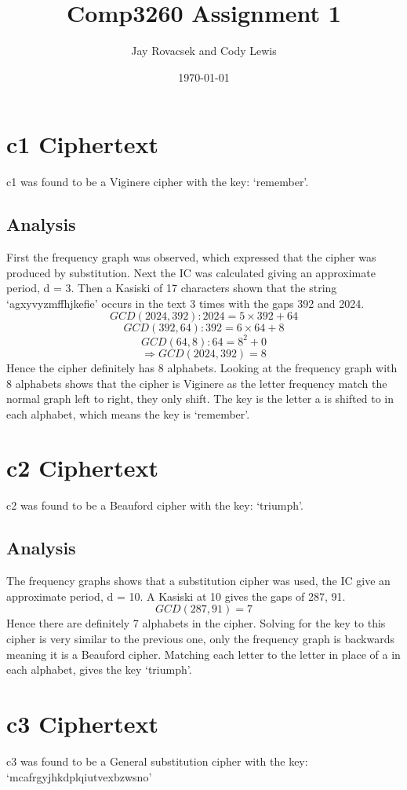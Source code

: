 \documentclass{article}
\title{Comp3260 Assignment 1}
\author{Jay Rovacsek and Cody Lewis}
\date{\today}
\begin{document}
  
    \maketitle
    \section{c1 Ciphertext}
    c1 was found to be a Viginere cipher with the key: `remember'.
      \subsection{Analysis}
      First the frequency graph was observed, which expressed that the cipher
      was produced by substitution. Next the IC was calculated giving an 
      approximate period, d = 3. Then a Kasiski of 17 characters shown that the
      string `agxyvyzmffhjkefie' occurs in the text 3 times with the gaps
      392 and 2024.
        \[ GCD(2024,392): 2024 = 5 \times 392 + 64 \] 
        \[ GCD(392,64): 392 = 6 \times 64 + 8 \] 
        \[ GCD(64,8): 64 = 8^2 + 0 \] 
        \[ \Rightarrow GCD(2024,392) = 8 \] 
      Hence the cipher definitely has 8 alphabets. Looking at the frequency 
      graph with 8 alphabets shows that the cipher is Viginere as the letter 
      frequency match the normal graph left to right, they only shift. The 
      key is the letter a is shifted to in each alphabet, which means the key 
      is `remember'.
    \section{c2 Ciphertext}
    c2 was found to be a Beauford cipher with the key: `triumph'.
      \subsection{Analysis}
      The frequency graphs shows that a substitution cipher was used, the IC
      give an approximate period, d = 10. A Kasiski at 10 gives the gaps of 287,
      91.
        \[ GCD(287,91) = 7 \]
      Hence there are definitely 7 alphabets in the cipher. Solving for the key
      to this cipher is very similar to the previous one, only the frequency 
      graph is backwards meaning it is a Beauford cipher. Matching each letter
      to the letter in place of a in each alphabet, gives the key `triumph'.
    \section{c3 Ciphertext}
      c3 was found to be a General substitution cipher with the key: `mcafrgyjhkdplqiutvexbzwsno'
\end{document}
